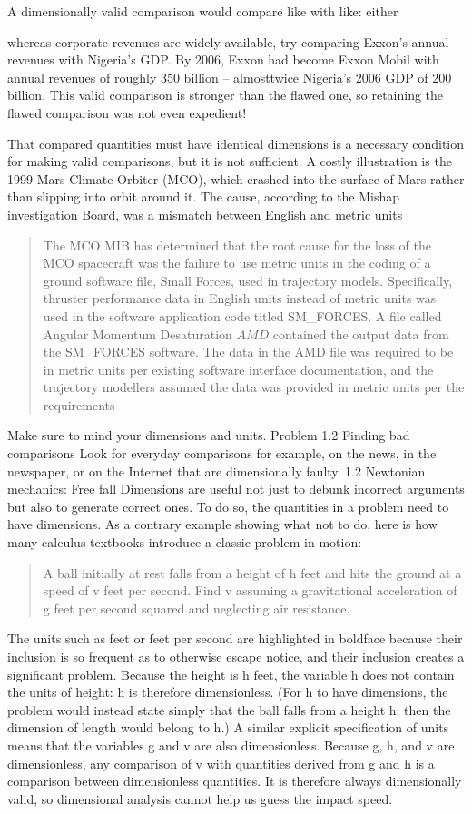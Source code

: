 \documentclass[12pt,a4paper]{article}
\begin{document}
A dimensionally valid comparison would compare like with like: either

whereas corporate revenues are widely available, try comparing Exxon’s
annual revenues with Nigeria’s GDP. By 2006, Exxon had become Exxon
Mobil with annual revenues of roughly 350 billion -- almosttwice Nigeria's 2006 GDP of   200 billion. This valid comparison is stronger than the
flawed one, so retaining the flawed comparison was not even expedient!

That compared quantities must have identical dimensions is a necessary
condition for making valid comparisons, but it is not sufficient. A costly
illustration is the 1999 Mars Climate Orbiter (MCO), which crashed into
the surface of Mars rather than slipping into orbit around it. The cause,
according to the Mishap investigation Board, was a mismatch between English and metric units
\begin{quote} The MCO MIB has determined that the root cause for the loss of the MCO
spacecraft was the failure to use metric units in the coding of a ground
software file, Small Forces, used in trajectory models. Specifically, thruster
performance data in English units instead of metric units was used in the
software application code titled SM\_FORCES. A file called Angular Momentum Desaturation \(AMD\) contained the output data from the
SM\_FORCES software. The data in the AMD file was required to be in metric
units per existing software interface documentation, and the trajectory modellers assumed the data was provided in metric units per the requirements
\end{quote}
Make sure to mind your dimensions and units.
Problem 1.2 Finding bad comparisons
Look for everyday comparisons for example, on the news, in the newspaper,
or on the Internet that are dimensionally faulty.
1.2 Newtonian mechanics: Free fall
Dimensions are useful not just to debunk incorrect arguments but also to
generate correct ones. To do so, the quantities in a problem need to have
dimensions. As a contrary example showing what not to do, here is how
many calculus textbooks introduce a classic problem in motion:
\begin{quote}
A ball initially at rest falls from a height of h feet and hits the ground at a
speed of v feet per second. Find v assuming a gravitational acceleration of g
feet per second squared and neglecting air resistance.
\end{quote}
The units such as feet or feet per second are highlighted in boldface
because their inclusion is so frequent as to otherwise escape notice, and
their inclusion creates a significant problem. Because the height is h
feet, the variable h does not contain the units of height: h is therefore
dimensionless. (For h to have dimensions, the problem would instead
state simply that the ball falls from a height h; then the dimension of
length would belong to h.) A similar explicit specification of units means
that the variables g and v are also dimensionless. Because g, h, and v
are dimensionless, any comparison of v with quantities derived from g
and h is a comparison between dimensionless quantities. It is therefore
always dimensionally valid, so dimensional analysis cannot help us guess
the impact speed.
\end{document}

